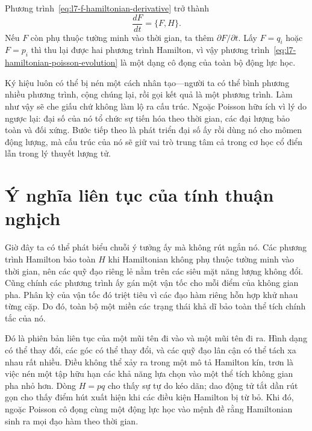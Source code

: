 Phương trình~\eqref{eq:l7-f-hamiltonian-derivative} trở thành
\begin{equation}
  \boxed{\frac{dF}{dt}=\{F,H\}.}
  \label{eq:l7-hamiltonian-poisson-evolution}
\end{equation}
Nếu \(F\) còn phụ thuộc tường minh vào thời gian, ta thêm \(\partial F/\partial t\). Lấy \(F=q_i\) hoặc \(F=p_i\) thì thu lại được hai phương trình Hamilton, vì vậy phương trình~\eqref{eq:l7-hamiltonian-poisson-evolution} là một dạng cô đọng của toàn bộ động lực học.

Ký hiệu luôn có thể bị nén một cách nhân tạo---người ta có thể bình phương nhiều phương trình, cộng chúng lại, rồi gọi kết quả là một phương trình. Làm như vậy sẽ che giấu chứ không làm lộ ra cấu trúc. Ngoặc Poisson hữu ích vì lý do ngược lại: đại số của nó tổ chức sự tiến hóa theo thời gian, các đại lượng bảo toàn và đối xứng. Bước tiếp theo là phát triển đại số ấy rồi dùng nó cho mômen động lượng, mà cấu trúc của nó sẽ giữ vai trò trung tâm cả trong cơ học cổ điển lẫn trong lý thuyết lượng tử.

\section{Ý nghĩa liên tục của tính thuận nghịch}

Giờ đây ta có thể phát biểu chuỗi ý tưởng ấy mà không rút ngắn nó. Các phương trình Hamilton bảo toàn \(H\) khi Hamiltonian không phụ thuộc tường minh vào thời gian, nên các quỹ đạo riêng lẻ nằm trên các siêu mặt năng lượng không đổi. Cũng chính các phương trình ấy gán một vận tốc cho mỗi điểm của không gian pha. Phân kỳ của vận tốc đó triệt tiêu vì các đạo hàm riêng hỗn hợp khử nhau từng cặp. Do đó, toàn bộ một miền các trạng thái khả dĩ bảo toàn thể tích chính tắc của nó.

Đó là phiên bản liên tục của một mũi tên đi vào và một mũi tên đi ra. Hình dạng có thể thay đổi, các góc có thể thay đổi, và các quỹ đạo lân cận có thể tách xa nhau rất nhiều. Điều không thể xảy ra trong một mô tả Hamilton kín, trơn là việc nén một tập hữu hạn các khả năng lựa chọn vào một thể tích không gian pha nhỏ hơn. Dòng \(H=pq\) cho thấy sự tự do kéo dãn; dao động tử tắt dần rút gọn cho thấy điểm hút xuất hiện khi các điều kiện Hamilton bị từ bỏ. Khi đó, ngoặc Poisson cô đọng cùng một động lực học vào mệnh đề rằng Hamiltonian sinh ra mọi đạo hàm theo thời gian.
